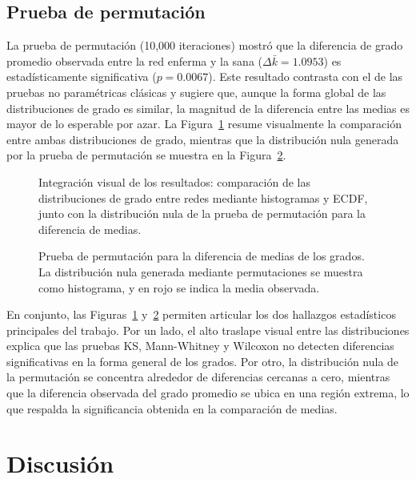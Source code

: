 \documentclass[conference]{IEEEtran}
\begin{document}
\subsection{Prueba de permutación}

La prueba de permutación (10,000 iteraciones) mostró que la diferencia de grado promedio observada entre la red enferma y la sana ($\Delta \bar{k} = 1.0953$) es estadísticamente significativa ($p = 0.0067$). Este resultado contrasta con el de las pruebas no paramétricas clásicas y sugiere que, aunque la forma global de las distribuciones de grado es similar, la magnitud de la diferencia entre las medias es mayor de lo esperable por azar. La Figura~\ref{fig:degree-comparison} resume visualmente la comparación entre ambas distribuciones de grado, mientras que la distribución nula generada por la prueba de permutación se muestra en la Figura~\ref{fig:perm-test}.

\begin{figure}[!t]
    \centering
    
    \caption{Integración visual de los resultados: comparación de las distribuciones de grado entre redes mediante histogramas y ECDF, junto con la distribución nula de la prueba de permutación para la diferencia de medias.}
    \label{fig:degree-comparison}
\end{figure}


\begin{figure}[!t]
    \centering
    
    \caption{Prueba de permutación para la diferencia de medias de los grados. La distribución nula generada mediante permutaciones se muestra como histograma, y en rojo se indica la media observada.}
    \label{fig:perm-test}
\end{figure}

En conjunto, las Figuras~\ref{fig:degree-comparison} y~\ref{fig:perm-test} permiten articular los dos hallazgos estadísticos principales del trabajo. Por un lado, el alto traslape visual entre las distribuciones explica que las pruebas KS, Mann-Whitney y Wilcoxon no detecten diferencias significativas en la forma general de los grados. Por otro, la distribución nula de la permutación se concentra alrededor de diferencias cercanas a cero, mientras que la diferencia observada del grado promedio se ubica en una región extrema, lo que respalda la significancia obtenida en la comparación de medias.

\section{Discusión}
\end{document}
